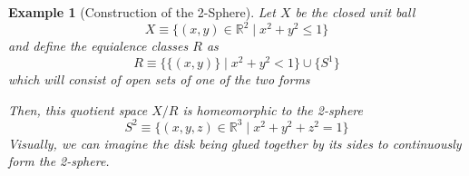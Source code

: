 \documentclass{article}
\newtheorem{example}{Example}[section]
\theoremstyle{remark}
\theoremstyle{definition}
\begin{document}
\begin{example}[Construction of the 2-Sphere]
Let $X$ be the closed unit ball 
\[X \equiv \{(x, y) \in \mathbb{R}^2 \; | \; x^2 + y^2 \leq 1\}\]
and define the equialence classes $R$ as 
\[R \equiv \big\{ \{(x, y)\} \; | \; x^2 + y^2 <1 \big\} \cup \{S^1\}\]
which will consist of open sets of one of the two forms
\begin{center}
\end{center}
Then, this quotient space $X / R$ is homeomorphic to the 2-sphere
\[S^2 \equiv \{(x, y, z) \in \mathbb{R}^3 \; | \; x^2 + y^2 + z^2 = 1\}\]
Visually, we can imagine the disk being glued together by its sides to continuously form the 2-sphere. 
\end{example}
\end{document}
